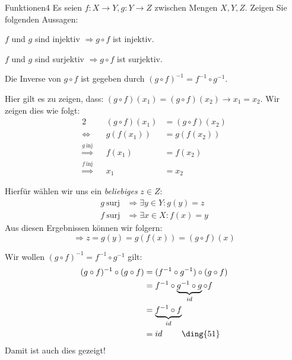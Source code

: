 \begin{aufgabe}{Funktionen}{4}
Es seien \(f : X \rightarrow Y, g: Y \rightarrow Z\)  zwischen Mengen \(X,Y,Z\). Zeigen Sie folgenden Aussagen: \begin{aufgaben}
    \item \(f\) und \(g\) sind injektiv \(\Rightarrow g \circ f\) ist injektiv.
    \item \(f\) und \(g\) sind surjektiv \(\Rightarrow g \circ f\) ist surjektiv.
    \item Die Inverse von \(g \circ f\) ist gegeben durch \((g \circ f)^{-1} = f^{-1} \circ g^{-1}\).
\end{aufgaben}\vspace{-1\baselineskip}
\Splitter\nskip
\begin{aufgaben}
    \item Hier gilt es zu zeigen, dass: $(g \circ f)(x_1) = (g \circ f)(x_2) \rightarrow x_1 = x_2$. Wir zeigen dies wie folgt: \begin{alignat*}{2}
        && (g \circ f)(x_1) &= (g \circ f) (x_2) \\
        \Leftrightarrow && g(f(x_1)) &= g(f(x_2)) \\
        \overset{g~\text{inj}}{\Rightarrow}&& f(x_1) &= f(x_2) \\
        \overset{f~\text{inj}}{\Rightarrow} && x_1 & = x_2
    \end{alignat*}
    \item Hierfür wählen wir uns ein \emph{beliebiges} $z \in Z$: \begin{align*}
        g~\text{surj} &\Rightarrow \exists y \in Y : g(y) = z \\
        f~\text{surj} &\Rightarrow \exists x \in X : f(x) = y
    \end{align*}
    Aus diesen Ergebnissen können wir folgern: \[\Rightarrow z = g(y) = g(f(x)) = (g\circ f)(x)\]
    \item Wir wollen $(g \circ f)^{-1} = f^{-1} \circ g^{-1}$ gilt: \begin{align*}
        (g \circ f)^{-1} \circ (g \circ f) &= (f^{-1} \circ g^{-1}) \circ (g \circ f) \\
        &= f^{-1} \circ \underbrace{g^{-1} \circ g}_{id} \circ f\\
        &= \underbrace{f^{-1} \circ f}_{id} \\
        &= id \qquad \text{ \ding{51}}
    \end{align*}
    Damit ist auch dies gezeigt! \hfill\qedsymbol
\end{aufgaben}
\end{aufgabe}

